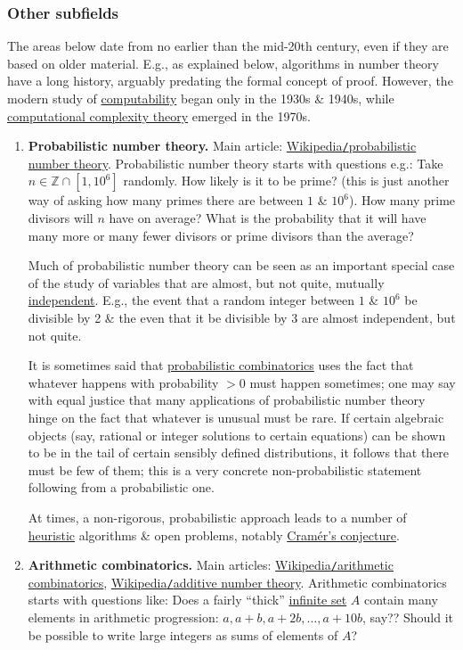 \documentclass{article}
\begin{document}
\subsubsection{Other subfields}
The areas below date from no earlier than the mid-20th century, even if they are based on older material. E.g., as explained below, algorithms in number theory have a long history, arguably predating the formal concept of proof. However, the modern study of \href{https://en.wikipedia.org/wiki/Computability}{computability} began only in the 1930s \& 1940s, while \href{https://en.wikipedia.org/wiki/Computational_complexity_theory}{computational complexity theory} emerged in the 1970s.
\begin{enumerate}
	\item {\bf Probabilistic number theory.} Main article: \href{https://en.wikipedia.org/wiki/Probabilistic_number_theory}{Wikipedia{\tt/}probabilistic number theory}. Probabilistic number theory starts with questions e.g.: Take $n\in\mathbb{Z}\cap[1,10^6]$ randomly. How likely is it to be prime? (this is just another way of asking how many primes there are between $1$ \& $10^6$). How many prime divisors will $n$ have on average? What is the probability that it will have many more or many fewer divisors or prime divisors than the average?
	
	Much of probabilistic number theory can be seen as an important special case of the study of variables that are almost, but not quite, mutually \href{https://en.wikipedia.org/wiki/Statistical_independence}{independent}. E.g., the event that a random integer between $1$ \& $10^6$ be divisible by 2 \& the even that it be divisible by 3 are almost independent, but not quite.
	
	It is sometimes said that \href{https://en.wikipedia.org/wiki/Probabilistic_combinatorics}{probabilistic combinatorics} uses the fact that whatever happens with probability $> 0$ must happen sometimes; one may say with equal justice that many applications of probabilistic number theory hinge on the fact that whatever is unusual must be rare. If certain algebraic objects (say, rational or integer solutions to certain equations) can be shown to be in the tail of certain sensibly defined distributions, it follows that there must be few of them; this is a very concrete non-probabilistic statement following from a probabilistic one.
	
	At times, a non-rigorous, probabilistic approach leads to a number of \href{https://en.wikipedia.org/wiki/Heuristic}{heuristic} algorithms \& open problems, notably \href{https://en.wikipedia.org/wiki/Cram%C3%A9r%27s_conjecture}{Cram\'er's conjecture}.
	\item {\bf Arithmetic combinatorics.} Main articles: \href{https://en.wikipedia.org/wiki/Arithmetic_combinatorics}{Wikipedia{\tt/}arithmetic combinatorics}, \href{https://en.wikipedia.org/wiki/Additive_number_theory}{Wikipedia{\tt/}additive number theory}. Arithmetic combinatorics starts with questions like: Does a fairly ``thick'' \href{https://en.wikipedia.org/wiki/Infinite_set}{infinite set} $A$ contain many elements in arithmetic progression: $a,a + b,a + 2b,\ldots,a + 10b$, say?? Should it be possible to write large integers as sums of elements of $A$?
	

\end{enumerate}
\end{document}
